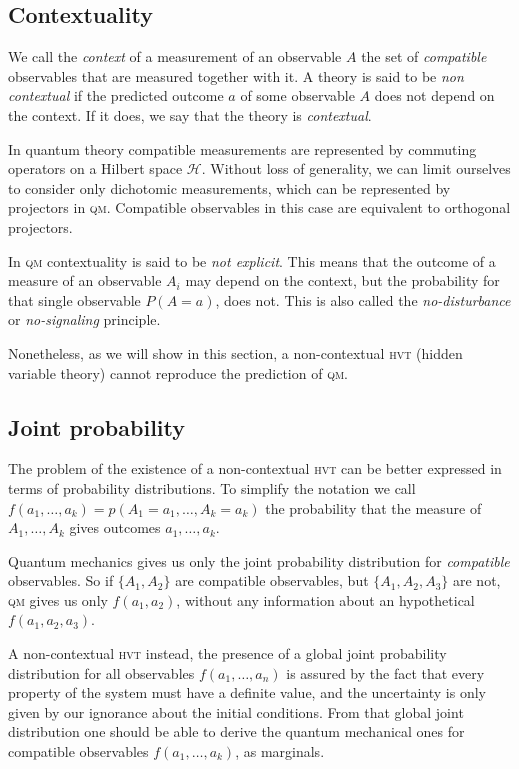 \documentclass[a4paper]{article}
\newcommand{\Hil}{\mathcal{H}}
\newcommand{\acron}[1]{\textsc{#1}}
\newcommand{\HVT}{\acron{hvt}}
\newcommand{\QM}{\acron{qm}}
\theoremstyle{definition}
\begin{document}
\subsection{Contextuality}
We call the \emph{context} of a measurement of an observable $A$ the set of \emph{compatible}
observables that are measured together with it.
A theory is said to be \emph{non contextual} if the predicted outcome $a$ of some observable
$A$ does not depend on the context.
If it does, we say that the theory is \emph{contextual}.

In quantum theory compatible measurements are represented by commuting operators
on a Hilbert space $\Hil$.
Without loss of generality, we can limit ourselves to consider only dichotomic
measurements, which can be represented by projectors in \QM{}.
Compatible observables in this case are equivalent to orthogonal projectors.

In \QM{} contextuality is said to be \emph{not explicit}. This means that the outcome of a measure of an
observable $A_i$ may depend on the context, but the probability for that single
observable $P(A = a)$, does not.
This is also called the \emph{no-disturbance} or \emph{no-signaling} principle.

Nonetheless, as we will show in this section, a non-contextual \HVT{} (hidden
variable theory) cannot reproduce the prediction of \QM{}.

\subsection{Joint probability}
\label{sec:joint_prob}
The problem of the existence of a non-contextual \HVT{} can be better
expressed in terms of probability distributions.
To simplify the notation we call $f(a_1,\ldots,a_k) = p(A_1=a_1, \ldots,
A_k=a_k)$ the probability that the measure of $A_1,\ldots,A_k$ gives outcomes
$a_1,\ldots,a_k$.

Quantum mechanics gives us only the joint probability distribution for
\emph{compatible} observables.
So if $\{A_1, A_2\}$ are compatible observables, but $\{A_1, A_2, A_3\}$ are
not, \QM{} gives us only $f(a_1, a_2)$, without any information about an
hypothetical $f(a_1, a_2, a_3)$.

A non-contextual \HVT{} instead, the presence of a global joint probability distribution for all
observables $f(a_1, \ldots, a_n)$ is assured by the fact that every property of
the system must have a definite value, and the uncertainty is only given by our
ignorance about the initial conditions.
From that global joint distribution one should be able to derive the quantum
mechanical ones for compatible observables $f(a_1, \ldots, a_k)$, as marginals.
\end{document}
